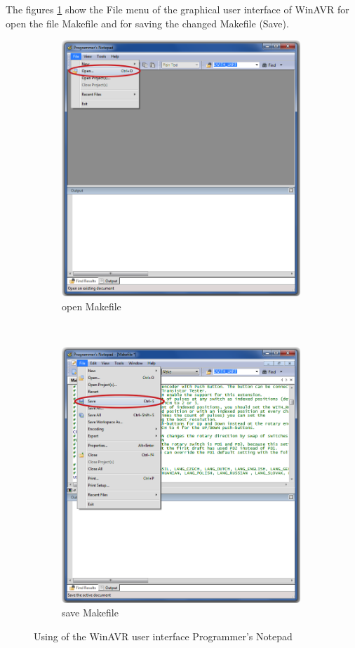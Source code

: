 The figures \ref{fig:WinAVR1} show the File menu of the graphical user interface of WinAVR for
open the file Makefile and for saving the changed Makefile (Save).

\begin{figure}[H]
  \begin{subfigure}[b]{9cm}
    \centering
    \includegraphics[width=9cm]{../PNG/Notepad_open.png}
    \caption{open Makefile}
  \end{subfigure}
  ~
  \begin{subfigure}[b]{9cm}
    \centering
    \includegraphics[width=9cm]{../PNG/Notepad_save.png}
    \caption{save Makefile}
  \end{subfigure}
  \caption{Using of the WinAVR user interface Programmer's Notepad}
  \label{fig:WinAVR1}
\end{figure}

